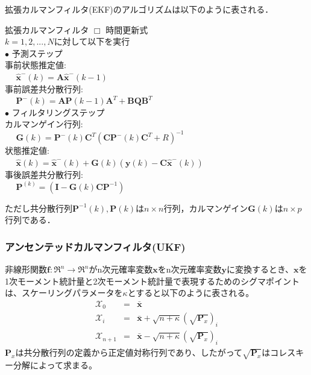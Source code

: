 \documentclass[twocolumn,oneside,a4paper]{article}
\begin{document}
拡張カルマンフィルタ(EKF)のアルゴリズムは以下のように表される．
  \begin{itembox}[l]{拡張カルマンフィルタ}
    $\Box$ 時間更新式\\
    $k=1,2,...,N$に対して以下を実行\\
     $\bullet$ 予測ステップ\\
     事前状態推定値: \\
     $\:\:\:\:\:\: \hat{\bm{x}}^{-}(k) = \bm{A}\hat{\bm{x}}^{-}(k-1)$\\
     事前誤差共分散行列: \\
     $\:\:\:\:\:\: \bm{P}^{-}(k)=\bm{A}\bm{P}(k-1)\bm{A}^{T}+\bm{BQ}\bm{B}^T$\\         
     $\bullet$ フィルタリングステップ\\
     カルマンゲイン行列: \\
     $\:\:\:\:\:\: \bm{G}(k)=\bm{P}^{-}(k)\bm{C}^T(\bm{C}\bm{P}^{-}(k)\bm{C}^{T}+R)^{-1}$\\
     状態推定値: \\
     $\:\:\:\:\:\: \hat{\bm{x}}(k) = \hat{\bm{x}}^{-}(k) + \bm{G}(k)(\bm{y}(k)-\bm{C}\hat{\bm{x}}^{-}(k))$\\
     事後誤差共分散行列: \\
     $\:\:\:\:\:\: \bm{P}^(k)=(\bm{I}-\bm{G}(k)\bm{C}\bm{P}^{-1})$
  \end{itembox}

ただし共分散行列$\bm{P}^{-1}(k), \bm{P}(k)$は$n \times n$行列，カルマンゲイン$\bm{G}(k)$は$n \times p$行列である．



\subsubsection{アンセンテッドカルマンフィルタ(UKF)}
非線形関数$\bm{f}: \mathfrak{R}^n \rightarrow \mathfrak{R}^n$がn次元確率変数$\bm{x}$をn次元確率変数$\bm{y}$に変換するとき、$\bm{x}$を1次モーメント統計量と2次モーメント統計量で表現するためのシグマポイントは、スケーリングパラメータを$\kappa$とすると以下のように表される。
\begin{eqnarray*}
	\mathscr{X}_0 &=& \bar{\bm{x}} \\
	\mathscr{X}_i &=& \bar{\bm{x}} + \sqrt{n+\kappa}(\sqrt{\bm{P}_x})_i\\
	\mathscr{X}_{n+1} &=& \bar{\bm{x}} - \sqrt{n+\kappa}(\sqrt{\bm{P}_x})_i
\end{eqnarray*}
$\bm{P}_x$は共分散行列の定義から正定値対称行列であり、したがって$\sqrt{\bm{P}_x}$はコレスキー分解によって求まる。
\end{document}
